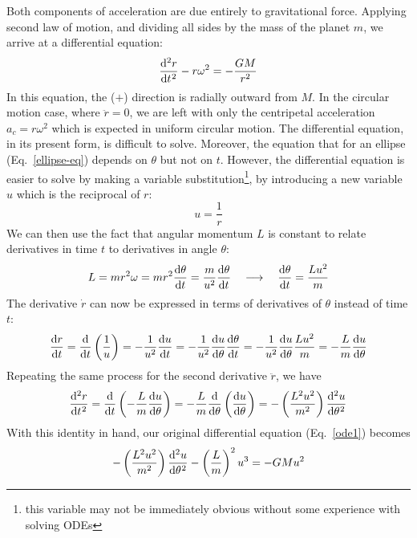 \documentclass{../../../oss-handout}
\begin{document}
Both components of acceleration are due entirely to gravitational force.
Applying second law of motion, and dividing all sides by the mass of the planet
$m$, we arrive at a differential equation:
\begin{equation}
  \diff[2]rt-r\omega^2=-\frac{GM}{r^2}
  \label{ode1}
\end{equation}
In this equation, the ($+$) direction is radially outward from $M$. In the
circular motion case, where $\ddot{r}=0$, we are left with only the centripetal
acceleration
$a_c=r\omega^2$ which is expected in uniform circular motion. The differential
equation, in its present form, is difficult to solve. Moreover, the equation
that for an ellipse (Eq.~\ref{ellipse-eq}) depends on $\theta$ but not on $t$.
However, the
differential equation is easier to solve by making a variable
substitution\footnote{this variable may not be immediately obvious without
  some experience with solving ODEs}, by introducing a new variable $u$ which
is the reciprocal of $r$:
\begin{equation}
  u=\frac1r
\end{equation}
We can then use the fact that angular momentum $L$ is constant to relate
derivatives in time $t$ to derivatives in angle $\theta$:
\begin{equation}
  L=mr^2\omega=mr^2\diff{\theta}t=\frac{m}{u^2}\diff{\theta}t
  \quad\longrightarrow\quad
  \diff{\theta}t=\frac{Lu^2}m
\end{equation}
The derivative $\dot{r}$ can now be expressed in terms of derivatives of
$\theta$ instead of time $t$:
\begin{equation}
  \diff rt =\diff*{\left(\frac1u\right)}t
  =-\frac1{u^2}\diff ut=-\frac1{u^2}\diff{u}{\theta}\diff{\theta}t
  = -\frac1{u^2}\diff{u}{\theta} \frac{Lu^2}{m}
  = -\frac{L}m\diff{u}{\theta}
\end{equation}
Repeating the same process for the second derivative $\ddot{r}$, we have
\begin{equation}
  \diff[2] rt = \diff*{\left(-\frac{L}{m}\diff{u}{\theta}\right)}t
  = -\frac{L}m\diff*{\left(\diff{u}{\theta}\right)}{\theta} \\
  = -\left(\frac{L^2u^2}{m^2}\right)\diff[2]u\theta
\end{equation}
With this identity in hand, our original differential equation
(Eq.~\ref{ode1}) becomes
\begin{equation}
  -\left(\frac{L^2u^2}{m^2}\right)\diff[2]u\theta-\left(\frac{L}{m}\right)^2u^3
  = -GMu^2
\end{equation}
\end{document}
